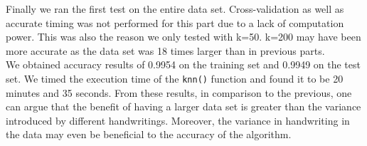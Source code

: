 \documentclass[paper=a4, fontsize=11pt]{scrartcl} %
\numberwithin{equation}{section} %
\numberwithin{figure}{section} %
\numberwithin{table}{section} %
\begin{document}
Finally we ran the first test on the entire data set. Cross-validation as well as accurate timing was not performed for this part due to a lack of computation power. This was also the reason we only tested with k=50. k=200 may have been more accurate as the data set was 18 times larger than in previous parts.\\

We obtained accuracy results of 0.9954 on the training set and 0.9949 on the test set. We timed the execution time of the \texttt{knn()} function and found it to be 20 minutes and 35 seconds. From these results, in comparison to the previous, one can argue that the benefit of having a larger data set is greater than the variance introduced by different handwritings. Moreover, the variance in handwriting in the data may even be beneficial to the accuracy of the algorithm.\\



\end{document}
